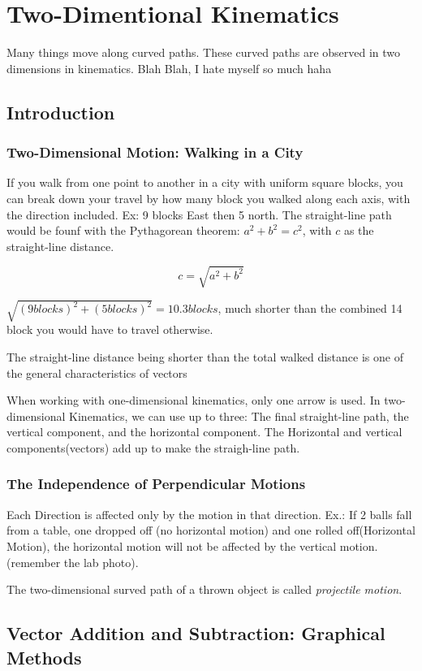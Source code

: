 \documentclass{article}
\begin{document}
\section{Two-Dimentional Kinematics}
Many things move along curved paths. These curved paths are observed in two dimensions in kinematics. Blah Blah, I hate myself so much haha

\subsection{Introduction}
\subsubsection{Two-Dimensional Motion: Walking in a City}
If you walk from one point to another in a city with uniform square blocks, you can break down your travel by how many block you walked along each axis, with the direction included. Ex: 9 blocks East then 5 north. The straight-line path would be founf with the Pythagorean theorem: $a^2 + b^2 = c^2$, with $c$ as the straight-line distance.

\[c = \sqrt{a^2 + b^2} \]

$\sqrt{(9 blocks)^2 + (5 blocks)^2} = 10.3 blocks$, much shorter than the combined 14 block you would have to travel otherwise.

The straight-line distance being shorter than the total walked distance is one of the general characteristics of vectors

When working with one-dimensional kinematics, only one arrow is used. In two-dimensional Kinematics, we can use up to three: The final straight-line path, the vertical component, and the horizontal component. The Horizontal and vertical components(vectors) add up to make the straigh-line path.

\subsubsection{The Independence of Perpendicular Motions}
Each Direction is affected only by the motion in that direction.
Ex.: If 2 balls fall from a table, one dropped off (no horizontal motion) and one rolled off(Horizontal Motion), the horizontal motion will not be affected by the vertical motion. (remember the lab photo).

The two-dimensional  surved path of a thrown object is called \emph{projectile motion}. 

\subsection{Vector Addition and Subtraction: Graphical Methods}
\end{document}
